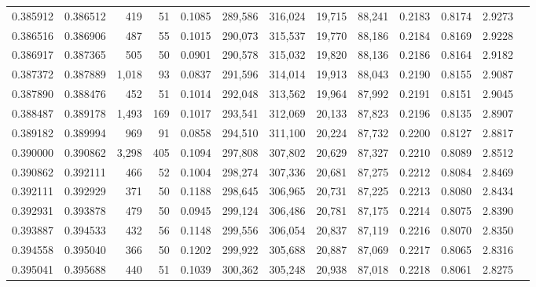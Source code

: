 \begin{tabular}{rrrrrrrrrrrrr}
0.385912 & 0.386512 &   419 &  51 &                                     0.1085 & 289,586 & 316,024 &  19,715 &  88,241 & 0.2183 & 0.8174 & 2.9273 \\
0.386516 & 0.386906 &   487 &  55 &                                     0.1015 & 290,073 & 315,537 &  19,770 &  88,186 & 0.2184 & 0.8169 & 2.9228 \\
0.386917 & 0.387365 &   505 &  50 &                                     0.0901 & 290,578 & 315,032 &  19,820 &  88,136 & 0.2186 & 0.8164 & 2.9182 \\
0.387372 & 0.387889 & 1,018 &  93 &                                     0.0837 & 291,596 & 314,014 &  19,913 &  88,043 & 0.2190 & 0.8155 & 2.9087 \\
0.387890 & 0.388476 &   452 &  51 &                                     0.1014 & 292,048 & 313,562 &  19,964 &  87,992 & 0.2191 & 0.8151 & 2.9045 \\
0.388487 & 0.389178 & 1,493 & 169 &                                     0.1017 & 293,541 & 312,069 &  20,133 &  87,823 & 0.2196 & 0.8135 & 2.8907 \\
0.389182 & 0.389994 &   969 &  91 &                                     0.0858 & 294,510 & 311,100 &  20,224 &  87,732 & 0.2200 & 0.8127 & 2.8817 \\
0.390000 & 0.390862 & 3,298 & 405 &                                     0.1094 & 297,808 & 307,802 &  20,629 &  87,327 & 0.2210 & 0.8089 & 2.8512 \\
0.390862 & 0.392111 &   466 &  52 &                                     0.1004 & 298,274 & 307,336 &  20,681 &  87,275 & 0.2212 & 0.8084 & 2.8469 \\
0.392111 & 0.392929 &   371 &  50 &                                     0.1188 & 298,645 & 306,965 &  20,731 &  87,225 & 0.2213 & 0.8080 & 2.8434 \\
0.392931 & 0.393878 &   479 &  50 &                                     0.0945 & 299,124 & 306,486 &  20,781 &  87,175 & 0.2214 & 0.8075 & 2.8390 \\
0.393887 & 0.394533 &   432 &  56 &                                     0.1148 & 299,556 & 306,054 &  20,837 &  87,119 & 0.2216 & 0.8070 & 2.8350 \\
0.394558 & 0.395040 &   366 &  50 &                                     0.1202 & 299,922 & 305,688 &  20,887 &  87,069 & 0.2217 & 0.8065 & 2.8316 \\
0.395041 & 0.395688 &   440 &  51 &                                     0.1039 & 300,362 & 305,248 &  20,938 &  87,018 & 0.2218 & 0.8061 & 2.8275 \\

\end{tabular}
